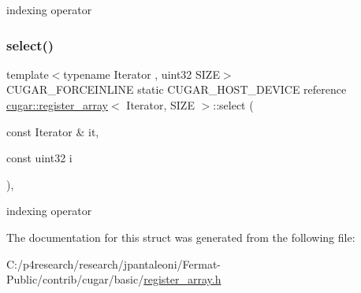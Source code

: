 indexing operator \mbox{\label{structcugar_1_1register__array_a546daee4bb1bbc7d471367df7e74c900}} 
\subsubsection{\texorpdfstring{select()}{select()}}
{\footnotesize\ttfamily template$<$typename Iterator , uint32 S\+I\+ZE$>$ \\
C\+U\+G\+A\+R\+\_\+\+F\+O\+R\+C\+E\+I\+N\+L\+I\+NE static C\+U\+G\+A\+R\+\_\+\+H\+O\+S\+T\+\_\+\+D\+E\+V\+I\+CE reference \hyperlink{structcugar_1_1register__array}{cugar\+::register\+\_\+array}$<$ Iterator, S\+I\+ZE $>$\+::select (\begin{DoxyParamCaption}\item[{const Iterator \&}]{it,  }\item[{const uint32}]{i }\end{DoxyParamCaption})\hspace{0.3cm}{\ttfamily [inline]}, {\ttfamily [static]}}

indexing operator 

The documentation for this struct was generated from the following file\+:\begin{DoxyCompactItemize}
\item 
C\+:/p4research/research/jpantaleoni/\+Fermat-\/\+Public/contrib/cugar/basic/\hyperlink{register__array_8h}{register\+\_\+array.\+h}\end{DoxyCompactItemize}
